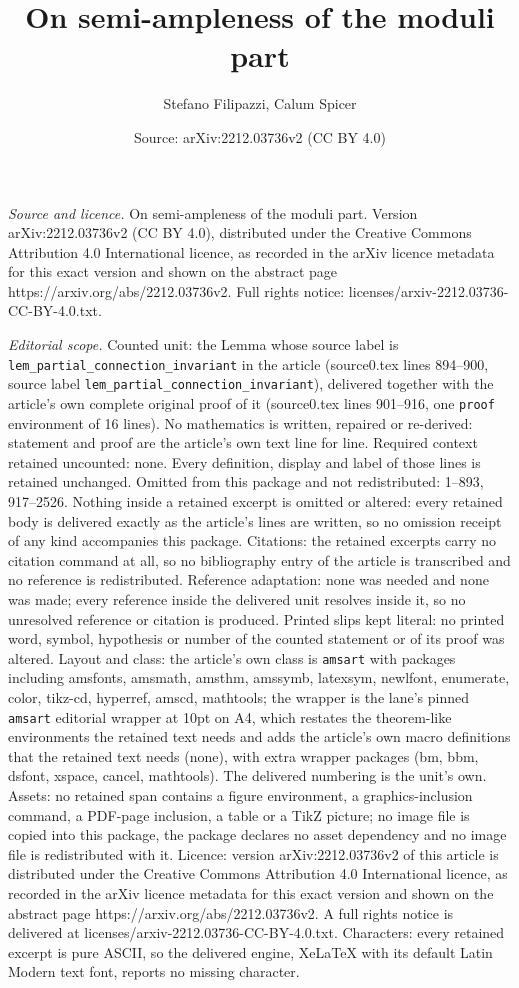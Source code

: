 \documentclass[10pt,a4paper]{amsart}
\title[On semi-ampleness of the moduli part]{On semi-ampleness of the moduli part}
\author{Stefano Filipazzi, Calum Spicer}
\date{Source: arXiv:2212.03736v2 (CC BY 4.0)}
\begin{document}
\maketitle

\noindent\emph{Source and licence.} On semi-ampleness of the moduli part. Version arXiv:2212.03736v2 (CC BY 4.0), distributed under the Creative Commons Attribution 4.0 International licence, as recorded in the arXiv licence metadata for this exact version and shown on the abstract page https://arxiv.org/abs/2212.03736v2. Full rights notice: licenses/arxiv-2212.03736-CC-BY-4.0.txt.\par\smallskip

\noindent\textit{Editorial scope.} Counted unit: the Lemma whose source label is \texttt{lem\_partial\_connection\_invariant} in the article (source0.tex lines 894--900, source label \texttt{lem\_partial\_connection\_invariant}), delivered together with the article's own complete original proof of it (source0.tex lines 901--916, one \texttt{proof} environment of 16 lines). No mathematics is written, repaired or re-derived: statement and proof are the article's own text line for line. Required context retained uncounted: none. Every definition, display and label of those lines is retained unchanged. Omitted from this package and not redistributed: 1--893, 917--2526. Nothing inside a retained excerpt is omitted or altered: every retained body is delivered exactly as the article's lines are written, so no omission receipt of any kind accompanies this package. Citations: the retained excerpts carry no citation command at all, so no bibliography entry of the article is transcribed and no reference is redistributed. Reference adaptation: none was needed and none was made; every reference inside the delivered unit resolves inside it, so no unresolved reference or citation is produced. Printed slips kept literal: no printed word, symbol, hypothesis or number of the counted statement or of its proof was altered. Layout and class: the article's own class is \texttt{amsart} with packages including amsfonts, amsmath, amsthm, amssymb, latexsym, newlfont, enumerate, color, tikz-cd, hyperref, amscd, mathtools; the wrapper is the lane's pinned \texttt{amsart} editorial wrapper at 10pt on A4, which restates the theorem-like environments the retained text needs and adds the article's own macro definitions that the retained text needs (none), with extra wrapper packages (bm, bbm, dsfont, xspace, cancel, mathtools). The delivered numbering is the unit's own. Assets: no retained span contains a figure environment, a graphics-inclusion command, a PDF-page inclusion, a table or a TikZ picture; no image file is copied into this package, the package declares no asset dependency and no image file is redistributed with it. Licence: version arXiv:2212.03736v2 of this article is distributed under the Creative Commons Attribution 4.0 International licence, as recorded in the arXiv licence metadata for this exact version and shown on the abstract page https://arxiv.org/abs/2212.03736v2. A full rights notice is delivered at licenses/arxiv-2212.03736-CC-BY-4.0.txt. Characters: every retained excerpt is pure ASCII, so the delivered engine, XeLaTeX with its default Latin Modern text font, reports no missing character.
\end{document}
